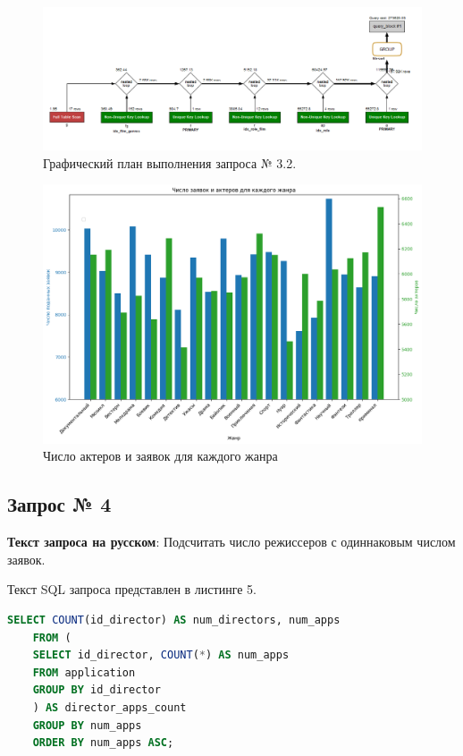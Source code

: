 \documentclass[11pt,a4paper,final]{article} %
\begin{document}
\begin{figure}[H]
	\centering
	\includegraphics[width=1.0\linewidth]{ex32.png}
	\caption{Графический план выполнения запроса № 3.2.}
	\label{fig:ex32}
\end{figure}

\begin{figure}[H]
	\centering
	\includegraphics[width=1.0\linewidth]{d3.png}
	\caption{Число актеров и заявок для каждого жанра}
	\label{fig:d3}
\end{figure}


\subsection{Запрос № 4}

\par \textbf{Текст запроса на русском}: Подсчитать число режиссеров с одиннаковым числом заявок. 
\par Текст SQL запроса представлен в листинге 5.

\begin{lstlisting}[caption=SQL запрос № 4, language=SQL]
	SELECT COUNT(id_director) AS num_directors, num_apps
	FROM (
	SELECT id_director, COUNT(*) AS num_apps
	FROM application
	GROUP BY id_director
	) AS director_apps_count
	GROUP BY num_apps
	ORDER BY num_apps ASC;
\end{lstlisting}
\end{document}
